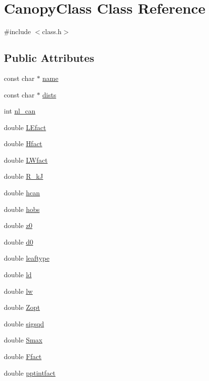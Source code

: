 \hypertarget{class_canopy_class}{}\section{Canopy\+Class Class Reference}
\label{class_canopy_class}


{\ttfamily \#include $<$class.\+h$>$}

\subsection*{Public Attributes}
\begin{DoxyCompactItemize}
\item 
const char $\ast$ \hyperlink{class_canopy_class_a14ae80794aedded6d09ffb9beb4ae08a}{name}
\item 
const char $\ast$ \hyperlink{class_canopy_class_af49142f889313f3c4a9a967c74863aca}{dists}
\item 
int \hyperlink{class_canopy_class_afb008f247aa7e63d132b3d86a332e506}{nl\+\_\+can}
\item 
double \hyperlink{class_canopy_class_a203d056ed0126ab6416d7e1ff709b8a0}{L\+Efact}
\item 
double \hyperlink{class_canopy_class_a89b02239c0afeb67eb074118f729fafb}{Hfact}
\item 
double \hyperlink{class_canopy_class_a15ed0a020cea13db4ac2f3dba5153853}{L\+Wfact}
\item 
double \hyperlink{class_canopy_class_a91646e14ae67e4e59dc52042f49845e3}{R\+\_\+kJ}
\item 
double \hyperlink{class_canopy_class_a2d918ca5155f44cc7bf883d8650cbd74}{hcan}
\item 
double \hyperlink{class_canopy_class_ad03ff52bff2fd710c0602d748b8d3d26}{hobs}
\item 
double \hyperlink{class_canopy_class_a610e754705ee648ce43472ca407f0c07}{z0}
\item 
double \hyperlink{class_canopy_class_aad893ee243ac053d329bdfe7efc8147b}{d0}
\item 
double \hyperlink{class_canopy_class_ad17d71476bd263f776034fc51e87add8}{leaftype}
\item 
double \hyperlink{class_canopy_class_a585b81defdce394abed955094986abcf}{ld}
\item 
double \hyperlink{class_canopy_class_a443cc1b41c242e130f1cabc47dc88fa4}{lw}
\item 
double \hyperlink{class_canopy_class_aac3992178bc031be49722b94c81686c4}{Zopt}
\item 
double \hyperlink{class_canopy_class_ad756a8ce79dc14b287297d54a56c19e7}{sigsqd}
\item 
double \hyperlink{class_canopy_class_a569dfd362839f84ccb47390e9c193987}{Smax}
\item 
double \hyperlink{class_canopy_class_a6790f73d08cd1b7818042fb011ff1bfb}{Ffact}
\item 
double \hyperlink{class_canopy_class_a209a8961d0399cfea4b918fd76d8167f}{pptintfact}
\end{DoxyCompactItemize}


